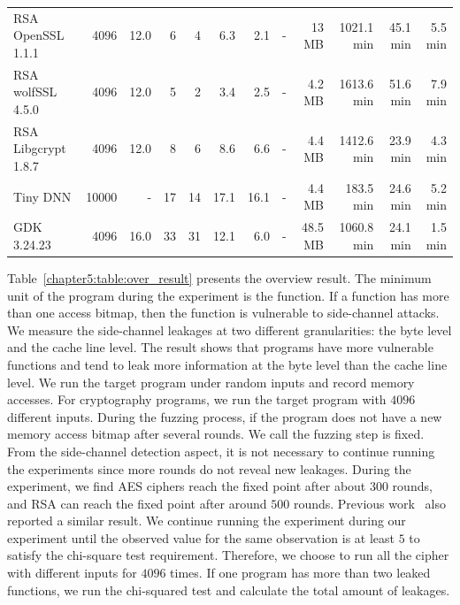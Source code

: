 \begin{table}
{\begin{tabular}{lrrrrrrrrrrr}
RSA OpenSSL 1.1.1& 4096 & 12.0 &6&4&6.3& 2.1&-&13 MB & 1021.1 min & 45.1 min & 5.5 min\\
RSA wolfSSL 4.5.0& 4096 & 12.0 &5&2&3.4& 2.5&-&4.2 MB & 1613.6 min & 51.6 min & 7.9 min\\
RSA Libgcrypt 1.8.7& 4096 & 12.0 &8&6&8.6& 6.6&-&4.4 MB & 1412.6 min & 23.9 min & 4.3 min\\
Tiny DNN & 10000 & - & 17&14&17.1&16.1&-& 4.4 MB & 183.5 min & 24.6 min & 5.2 min\\
GDK 3.24.23 & 4096 & 16.0 & 33&31& 12.1& 6.0&-& 48.5 MB & 1060.8 min & 24.1 min & 1.5 min\\
\bottomrule
\end{tabular}
}

\end{table}

Table~\ref{chapter5:table:over_result} presents the overview result. The minimum unit of the program during the experiment is the function. If a function has more than one access bitmap, then the function is vulnerable to side-channel attacks. We measure the side-channel leakages at two different granularities: the byte level and the cache line level. The result shows that programs have more vulnerable functions and tend to leak more information at the byte level than the cache line level. We run the target program under random inputs and record memory accesses. For cryptography programs, we run the target program with $4096$ different inputs. During the fuzzing process, if the program does not have a new memory access bitmap after several rounds. We call the fuzzing step is fixed. From the side-channel detection aspect, it is not necessary to continue running the experiments since more rounds do not reveal new leakages. During the experiment, we find AES ciphers reach the fixed point after about $300$ rounds, and RSA can reach the fixed point after around $500$ rounds. Previous work~\cite{217537} also reported a similar result. We continue running the experiment during our experiment until the observed value for the same observation is at least $5$ to satisfy the chi-square test requirement. Therefore, we choose to run all the cipher with different inputs for $4096$ times.  If one program has more than two leaked functions, we run the chi-squared test and calculate the total amount of leakages.




